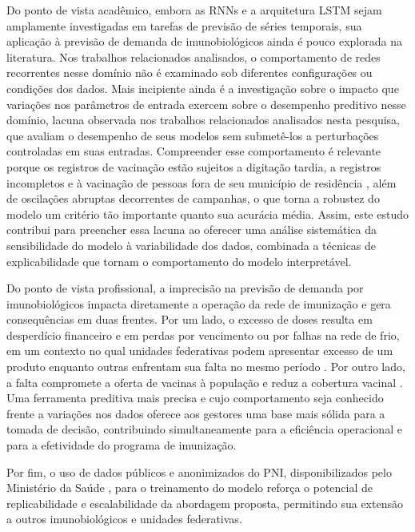 \documentclass[
    12pt,
    openright,
    oneside,
    a4paper,
    english,
    brazil
]{abntex2}
\begin{document}
Do ponto de vista acadêmico, embora as RNNs e a arquitetura LSTM sejam amplamente investigadas em tarefas de previsão de séries temporais, sua aplicação à previsão de demanda de imunobiológicos ainda é pouco explorada na literatura. Nos trabalhos relacionados analisados, o comportamento de redes recorrentes nesse domínio não é examinado sob diferentes configurações ou condições dos dados. Mais incipiente ainda é a investigação sobre o impacto que variações nos parâmetros de entrada exercem sobre o desempenho preditivo nesse domínio, lacuna observada nos trabalhos relacionados analisados nesta pesquisa, que avaliam o desempenho de seus modelos sem submetê-los a perturbações controladas em suas entradas. Compreender esse comportamento é relevante porque os registros de vacinação estão sujeitos a digitação tardia, a registros incompletos e à vacinação de pessoas fora de seu município de residência \cite{Lopes2022}, além de oscilações abruptas decorrentes de campanhas, o que torna a robustez do modelo um critério tão importante quanto sua acurácia média. Assim, este estudo contribui para preencher essa lacuna ao oferecer uma análise sistemática da sensibilidade do modelo à variabilidade dos dados, combinada a técnicas de explicabilidade que tornam o comportamento do modelo interpretável.

Do ponto de vista profissional, a imprecisão na previsão de demanda por imunobiológicos impacta diretamente a operação da rede de imunização e gera consequências em duas frentes. Por um lado, o excesso de doses resulta em desperdício financeiro e em perdas por vencimento ou por falhas na rede de frio, em um contexto no qual unidades federativas podem apresentar excesso de um produto enquanto outras enfrentam sua falta no mesmo período \cite{Lopes2022}. Por outro lado, a falta compromete a oferta de vacinas à população e reduz a cobertura vacinal \cite{Lopes2022}. Uma ferramenta preditiva mais precisa e cujo comportamento seja conhecido frente a variações nos dados oferece aos gestores uma base mais sólida para a tomada de decisão, contribuindo simultaneamente para a eficiência operacional e para a efetividade do programa de imunização.

Por fim, o uso de dados públicos e anonimizados do PNI, disponibilizados pelo Ministério da Saúde \cite{BrasilPNIDados}, para o treinamento do modelo reforça o potencial de replicabilidade e escalabilidade da abordagem proposta, permitindo sua extensão a outros imunobiológicos e unidades federativas.

\end{document}
